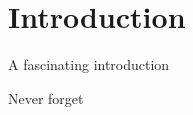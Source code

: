
\section{Introduction}
\label{sec:introduction}

A fascinating introduction

Never forget \cite{2018arXiv180808929C}
